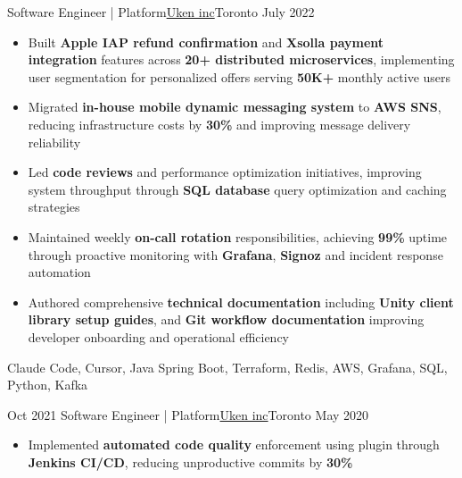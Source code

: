 %
%
%
\begin{experiences}
  \experienceCurrent
    {Software Engineer | Platform}{\href{https://uken.com}{Uken inc}}{Toronto}
    {July 2022} {
                    \begin{itemize}
                        \setlength\itemsep{0.6em}

                        \item Built \textbf{Apple IAP refund confirmation} and \textbf{Xsolla payment integration} features across \textbf{20+ distributed microservices}, implementing user segmentation for personalized offers serving \textbf{50K+} monthly active users

                        \item Migrated \textbf{in-house mobile dynamic messaging system} to \textbf{AWS SNS}, reducing infrastructure costs by \textbf{30\%} and improving message delivery reliability

                        \item Led \textbf{code reviews} and performance optimization initiatives, improving system throughput through \textbf{SQL database} query optimization and caching strategies

                        \item Maintained weekly \textbf{on-call rotation} responsibilities, achieving \textbf{99\%} uptime through proactive monitoring with \textbf{Grafana}, \textbf{Signoz} and incident response automation

                        \item Authored comprehensive \textbf{technical documentation} including \textbf{Unity client library setup guides}, and \textbf{Git workflow documentation} improving developer onboarding and operational efficiency
                    \end{itemize}
                    }
                    {Claude Code, Cursor, Java Spring Boot, Terraform, Redis, AWS, Grafana, SQL, Python, Kafka}

  \emptySeparator
  \experience
    {Oct 2021}   {Software Engineer | Platform}{\href{https://uken.com}{Uken inc}}{Toronto}
    {May 2020} {
                    \begin{itemize}
                        \setlength\itemsep{0.6em}
                        \item Implemented \textbf{automated code quality} enforcement using  plugin through \textbf{Jenkins CI/CD}, reducing unproductive commits by \textbf{30\%}


\end{itemize}}
\end{experiences}
